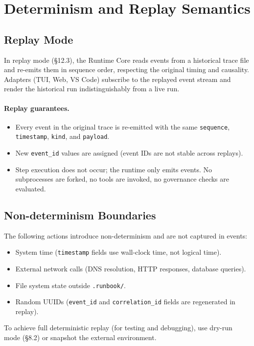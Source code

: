 \section{Determinism and Replay Semantics}

\subsection{Replay Mode}

In replay mode (§12.3), the Runtime Core reads events from a historical trace file and re-emits them in sequence order, respecting the original timing and causality. Adapters (TUI, Web, VS Code) subscribe to the replayed event stream and render the historical run indistinguishably from a live run.

\paragraph{Replay guarantees.}
\begin{itemize}
  \item Every event in the original trace is re-emitted with the same \texttt{sequence}, \texttt{timestamp}, \texttt{kind}, and \texttt{payload}.
  \item New \texttt{event\_id} values are assigned (event IDs are not stable across replays).
  \item Step execution does not occur; the runtime only emits events. No subprocesses are forked, no tools are invoked, no governance checks are evaluated.
\end{itemize}

\subsection{Non-determinism Boundaries}

The following actions introduce non-determinism and are not captured in events:
\begin{itemize}
  \item System time (\texttt{timestamp} fields use wall-clock time, not logical time).
  \item External network calls (DNS resolution, HTTP responses, database queries).
  \item File system state outside \texttt{.runbook/}.
  \item Random UUIDs (\texttt{event\_id} and \texttt{correlation\_id} fields are regenerated in replay).
\end{itemize}

To achieve full deterministic replay (for testing and debugging), use dry-run mode (§8.2) or snapshot the external environment.
